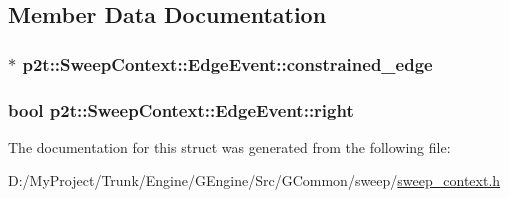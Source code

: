 \subsection{Member Data Documentation}
\hypertarget{structp2t_1_1_sweep_context_1_1_edge_event_a12627007e9501c178820e86dbf40967b}{}
\subsubsection[{constrained\+\_\+edge}]{$\ast$ p2t\+::\+Sweep\+Context\+::\+Edge\+Event\+::constrained\+\_\+edge}\label{structp2t_1_1_sweep_context_1_1_edge_event_a12627007e9501c178820e86dbf40967b}
\hypertarget{structp2t_1_1_sweep_context_1_1_edge_event_a7970343e9690e97ad56d1f6e47ba0c5d}{}
\subsubsection[{right}]{\setlength{\rightskip}{0pt plus 5cm}bool p2t\+::\+Sweep\+Context\+::\+Edge\+Event\+::right}\label{structp2t_1_1_sweep_context_1_1_edge_event_a7970343e9690e97ad56d1f6e47ba0c5d}


The documentation for this struct was generated from the following file\+:\begin{DoxyCompactItemize}
\item 
D\+:/\+My\+Project/\+Trunk/\+Engine/\+G\+Engine/\+Src/\+G\+Common/sweep/\hyperlink{sweep__context_8h}{sweep\+\_\+context.\+h}\end{DoxyCompactItemize}
